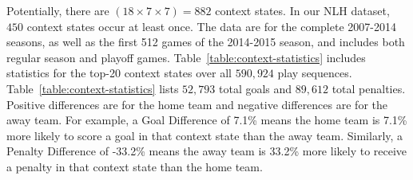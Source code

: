 \documentclass[]{article}
\begin{document}
Potentially, there are $(18 \times 7 \times 7) = 882$ context states. In our NLH dataset, $450$  context states occur at least once. The data are for the complete 2007-2014 seasons, as well as the first 512 games of the 2014-2015 season, and includes both regular season and playoff games. Table~\ref{table:context-statistics} includes statistics for the top-20 context states over all $590,924$ play sequences. Table~\ref{table:context-statistics} lists $52,793$ total goals and $89,612$ total penalties. 
Positive differences are for the home team and negative differences are for the away team. For example, a Goal Difference of 7.1\% means the home team is 7.1\% more likely to score a goal in that context state than the away team. Similarly, a Penalty Difference of -33.2\% means the away team is 33.2\% more likely to receive a penalty in that context state than the home team.
\end{document}

